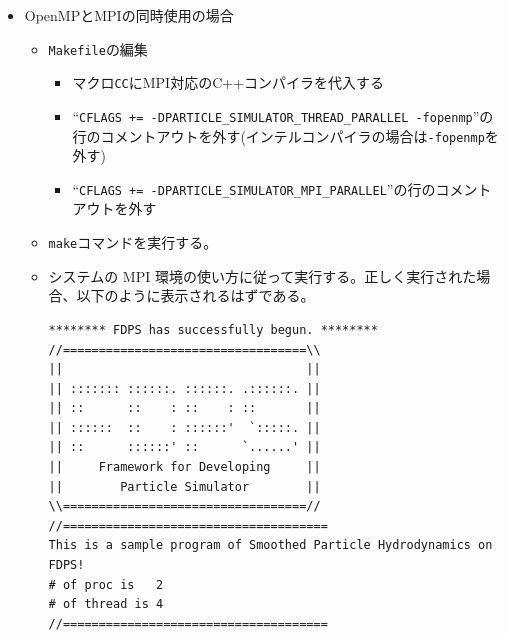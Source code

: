 \documentclass[12pt,a4paper,dvipdfmx]{jarticle}
\begin{document}
\begin{itemize}
\item OpenMPとMPIの同時使用の場合
  \begin{itemize}
  \item \texttt{Makefile}の編集
    \begin{itemize}
    \item マクロ\texttt{CC}にMPI対応のC++コンパイラを代入する
    \item ``\texttt{CFLAGS += -DPARTICLE\_SIMULATOR\_THREAD\_PARALLEL -fopenmp}''の
      行のコメントアウトを外す(インテルコンパイラの場合は\texttt{-fopenmp}を外す)
    \item ``\texttt{CFLAGS += -DPARTICLE\_SIMULATOR\_MPI\_PARALLEL}''の行のコメント
      アウトを外す
    \end{itemize}
  \item \texttt{make}コマンドを実行する。
  \item システムの MPI 環境の使い方に従って実行する。正しく実行された場合、以下のように表示されるはずである。
\begin{screen}
\begin{verbatim}
******** FDPS has successfully begun. ********
//==================================\\
||                                  ||
|| ::::::: ::::::. ::::::. .::::::. ||
|| ::      ::    : ::    : ::       ||
|| ::::::  ::    : ::::::'  `:::::. ||
|| ::      ::::::' ::      `......' ||
||     Framework for Developing     ||
||        Particle Simulator        ||
\\==================================//
//=====================================
This is a sample program of Smoothed Particle Hydrodynamics on FDPS!
# of proc is   2
# of thread is 4
//=====================================
\end{verbatim}
\end{screen}
  \end{itemize}
\end{itemize}
\end{document}
